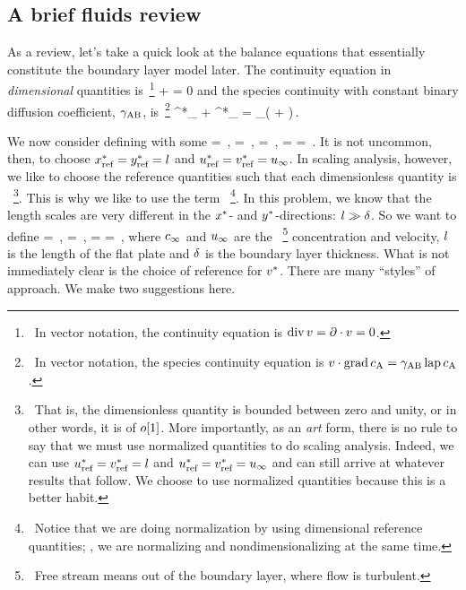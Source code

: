 \subsection{A brief fluids review}
As a review, let's take a quick look at the balance equations that essentially constitute the boundary layer model later. The continuity equation in \emph{dimensional} quantities is~\footnote{~In vector notation, the continuity equation is $\operatorname{div}v = \partial\cdot v = 0$.}
\bneq\label{eq:dimensionalcontinuityequation}
\ipd\posx\velx + \ipd\posy\vely = 0
\eneq
and the species continuity with constant binary diffusion coefficient, $\kmdiff_{\ce{AB}}$, is~\footnote{~In vector notation, the species continuity equation is $\lvel\iprod\grad\conc_{\ce{A}} = \kmdiff_{\ce{AB}}\lap\conc_{\ce{A}}$.}
\bneq\label{eq:dimensionaldiffusionequation}
\velx\ipd\posx\conc^*_{} + \vely\ipd\posy\conc^*_{} 
    = \kmdiff_{}\left( + \right)\,.
\eneq

We now consider defining  with some 
\beq
\ndconc = \,,\quad
\ndposx = \,,\quad
\ndposy = \,,\quad
\ndvelx = \quad{}\quad
\ndvely = \,.
\eeq
It is not uncommon, then, to choose $x^*_\text{ref} = y^*_\text{ref} = l$ and $u^*_\text{ref} = v^*_\text{ref} = u_{\infty}$. In scaling analysis, however, we like to choose the reference quantities such that each dimensionless quantity is ~\footnote{~That is, the dimensionless quantity is bounded between zero and unity, or in other words, it is of $o\!\left[{1}\right]$.
More importantly, as an \emph{art} form, there is no rule to say that we must use normalized quantities to do scaling analysis. Indeed, we can use $u^*_\text{ref} = v^*_\text{ref} = l$ and $u^*_\text{ref} = v^*_\text{ref} = u_{\infty}$ and can still arrive at whatever results that follow. We choose to use normalized quantities because this is a better habit.}. This is why we like to use the term ~\footnote{~Notice that we are doing normalization by using dimensional reference quantities; \ie, we are normalizing and nondimensionalizing at the same time.}. In this problem, we know that the length scales are very different in the $x^*$- and $y^*$-directions: $l\gg\delta$. So we want to define
\bneq\label{eq:scalingquantities}
\ndconc = \,,\quad
\ndposx = \dfrac{\posx}{\length}\,,\quad
\ndposy = \dfrac{\posy}{\blthck}\quad{}\quad
\ndvelx = \dfrac{\velx}{\fsvel}\,,
\eneq
where $c_{\infty}$ and $u_{\infty}$ are the ~\footnote{~Free stream means out of the boundary layer, where flow is turbulent.} concentration and velocity, $l$ is the length of the flat plate and $\delta$ is the boundary layer thickness. What is not immediately clear is the choice of reference for $v^*$. There are many ``styles'' of approach. We make two suggestions here.

